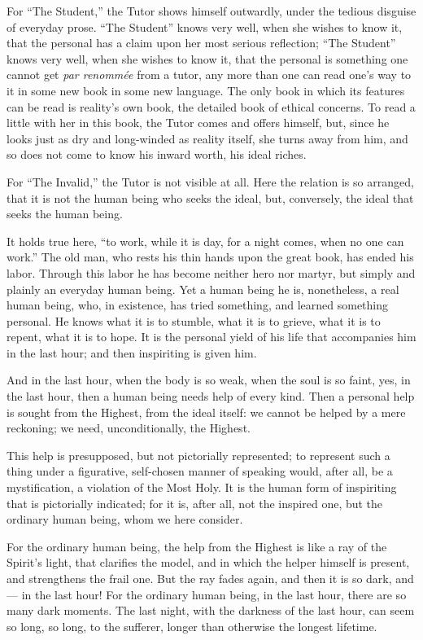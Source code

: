 \documentclass[12pt,a4paper]{book}
\begin{document}
For ``The Student,'' the Tutor shows himself outwardly, under the tedious disguise of everyday prose. ``The Student'' knows very well, when she wishes to know it, that the personal has a claim upon her most serious reflection; ``The Student'' knows very well, when she wishes to know it, that the personal is something one cannot get \textit{par renommée} from a tutor, any more than one can read one's way to it in some new book in some new language. The only book in which its features can be read is reality's own book, the detailed book of ethical concerns. To read a little with her in this book, the Tutor comes and offers himself, but, since he looks just as dry and long-winded as reality itself, she turns away from him, and so does not come to know his inward worth, his ideal riches.

For ``The Invalid,'' the Tutor is not visible at all. Here the relation is so arranged, that it is not the human being who seeks the ideal, but, conversely, the ideal that seeks the human being.

It holds true here, ``to work, while it is day, for a night comes, when no one can work.'' The old man, who rests his thin hands
upon the great book, has ended his labor. Through this labor he has become neither hero nor martyr, but simply and plainly an everyday human being. Yet a human being he is, nonetheless, a real human being, who, in existence, has tried something, and learned something personal. He knows what it is to stumble, what it is to grieve, what it is to repent, what it is to hope. It is the personal yield of his life that accompanies him in the last hour; and then inspiriting is given him.

And in the last hour, when the body is so weak, when the soul is so faint, yes, in the last hour, then a human being needs help of every kind. Then a personal help is sought from the Highest, from the ideal itself: we cannot be helped by a mere reckoning; we need, unconditionally, the Highest.

This help is presupposed, but not pictorially represented; to represent such a thing under a figurative, self-chosen manner of speaking would, after all, be a mystification, a violation of the Most Holy. It is the human form of inspiriting that is pictorially indicated; for it is, after all, not the inspired one, but the ordinary human being, whom we here consider.

For the ordinary human being, the help from the Highest is like a ray of the Spirit's light, that clarifies the model, and in which the helper himself is present, and strengthens the frail one. But the ray fades again, and then it is so dark, and --- in the last hour! For the ordinary human being, in the last hour, there are so many dark moments. The last night, with the darkness of the last hour, can seem so long, so long, to the sufferer, longer than otherwise the longest lifetime.
\end{document}
